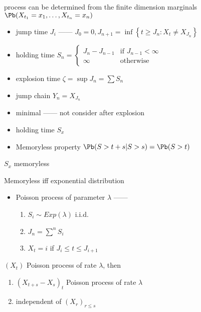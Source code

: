\begin{fact}
    process can be determined from the finite dimension marginals $\Pb(X_{t_1} = x_1, \dots, X_{t_n} = x_n)$
\end{fact}
\begin{itemize}
    \item jump time $J_i$ ------ $J_0 = 0, J_{n + 1} = \inf \left\{ t \geq J_n : X_t \neq X_{J_n} \right\}$
    \item holding time $S_n = \begin{cases}
                                  J_n - J_{n-1} & \text{if } J_{n-1} < \infty\\
                                  \infty & \text{otherwise }
    \end{cases}$
    \item explosion time $\zeta = \sup J_n = \sum S_n$
    \item jump chain $Y_n = X_{J_n}$
    \item minimal ------ not consider after explosion
    \item holding time $S_x$
    \item Memoryless property $\Pb(S > t+s | S > s) = \Pb(S > t)$
\end{itemize}

\begin{fact}
    $S_x$ memoryless
\end{fact}

\begin{thm}
    Memoryless iff exponential distribution
\end{thm}

\begin{itemize}
    \item Poisson process of parameter $\lambda$ ------ \begin{enumerate}
                                     \item $S_i \sim Exp(\lambda)$ i.i.d.\
                                     \item $J_n = \sum^n S_i$
                                     \item $X_t = i$ if $J_i \leq t \leq J_{i + 1}$
    \end{enumerate}
\end{itemize}

\begin{thm}
    $(X_t)$ Poisson process of rate $\lambda$, then
    \begin{enumerate}
        \item $(X_{t+s} - X_s)_t$ Poisson process of rate $\lambda$
        \item independent of $(X_r)_{r \leq s}$
    \end{enumerate}
\end{thm}

